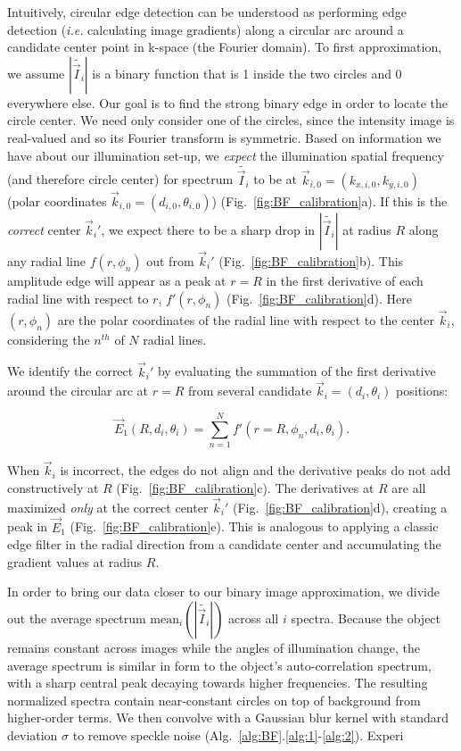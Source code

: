 Intuitively, circular edge detection can be understood as performing edge detection (\textit{i.e.} calculating image gradients) along a circular arc around a candidate center point in k-space (the Fourier domain). To first approximation, we assume $|\tilde{\vec{I}_i}|$ is a binary function that is 1 inside the two circles and 0 everywhere else. Our goal is to find the strong binary edge in order to locate the circle center.  We need only consider one of the circles, since the intensity image is real-valued and so its Fourier transform is symmetric. Based on information we have about our illumination set-up, we \textit{expect} the illumination spatial frequency (and therefore circle center) for spectrum $\tilde{\vec{I}_i}$ to be at $\vec{k}_{i,0} = (k_{x,i,0},k_{y,i,0})$ (polar coordinates $\vec{k}_{i,0} = (d_{i,0}, \theta_{i,0})$) (Fig.~\ref{fig:BF_calibration}a). If this is the \textit{correct} center  $\vec{k}_i'$, we expect there to be a sharp drop in $|\tilde{\vec{I}_i}|$ at radius $R$ along any radial line $f(r,\phi_n)$ out from $\vec{k}_i'$ (Fig.~\ref{fig:BF_calibration}b). This amplitude edge will appear as a peak at $r=R$ in the first derivative of each radial line with respect to $r$, $f'(r,\phi_n)$ (Fig.~\ref{fig:BF_calibration}d). Here $(r,\phi_n)$ are the polar coordinates of the radial line with respect to the center $\vec{k}_i$, considering the $n^{th}$ of $N$ radial lines.

We identify the correct $\vec{k}_i'$ by evaluating the summation of the first derivative around the circular arc at $r=R$ from several candidate $\vec{k}_i = (d_i,\theta_i)$ positions:

\begin{equation}
\vec{E}_1(R, d_i,\theta_i)=\sum_{n=1}^{N} f'(r = R,\phi_n,d_i,\theta_i).
\label{eq:eprime}
\end{equation}

\noindent When $\vec{k}_i$ is incorrect, the edges do not align and the derivative peaks do not add constructively at $R$ (Fig.~\ref{fig:BF_calibration}c). The derivatives at $R$ are all maximized \textit{only} at the correct center $\vec{k}_i'$ (Fig.~\ref{fig:BF_calibration}d), creating a peak in $\vec{E}_1$ (Fig.~\ref{fig:BF_calibration}e). This is analogous to applying a classic edge filter in the radial direction from a candidate center and accumulating the gradient values at radius $R$.

In order to bring our data closer to our binary image approximation, we divide out the average spectrum $\mathrm{mean}_i(|\tilde{\vec{I}_i}|)$ across all $i$ spectra. Because the object remains constant across images while the angles of illumination change, the average spectrum is similar in form to the object's auto-correlation spectrum, with a sharp central peak decaying towards higher frequencies. The resulting normalized spectra contain near-constant circles on top of background from higher-order terms. We then convolve with a Gaussian blur kernel with standard deviation $\sigma$ to remove speckle noise (Alg.~\ref{alg:BF}.\ref{alg:1}-\ref{alg:2}). Experi

